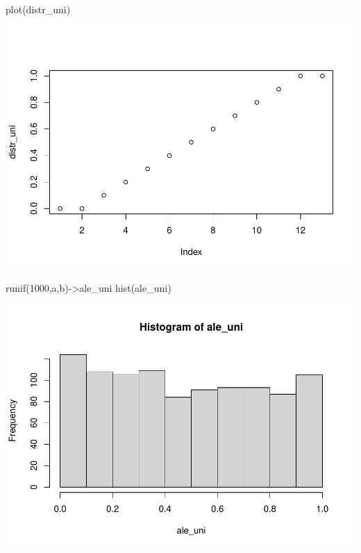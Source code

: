 \documentclass[
]{article}
\newenvironment{Shaded}{\begin{snugshade}}{\end{snugshade}}
\newcommand{\DecValTok}[1]{\textcolor[rgb]{0.00,0.00,0.81}{#1}}
\newcommand{\FunctionTok}[1]{\textcolor[rgb]{0.00,0.00,0.00}{#1}}
\newcommand{\NormalTok}[1]{#1}
\newcommand{\OtherTok}[1]{\textcolor[rgb]{0.56,0.35,0.01}{#1}}
\begin{document}
\begin{Shaded}
\begin{Highlighting}[]
\FunctionTok{plot}\NormalTok{(distr\_uni)}
\end{Highlighting}
\end{Shaded}

\includegraphics{Teoria4_files/figure-latex/Ejemplo distribucion uniforme-2.pdf}

\begin{Shaded}
\begin{Highlighting}[]
\FunctionTok{runif}\NormalTok{(}\DecValTok{1000}\NormalTok{,a,b)}\OtherTok{{-}\textgreater{}}\NormalTok{ale\_uni}
\FunctionTok{hist}\NormalTok{(ale\_uni)}
\end{Highlighting}
\end{Shaded}

\includegraphics{Teoria4_files/figure-latex/Ejemplo distribucion uniforme-3.pdf}
\end{document}
